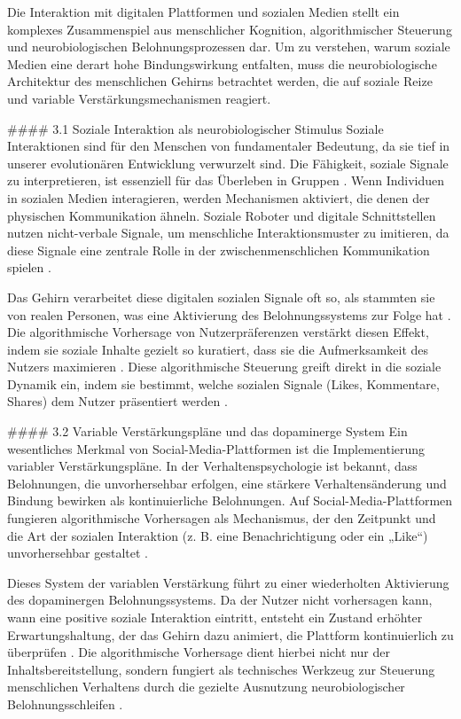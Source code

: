 \documentclass[11pt,a4paper]{article}
\begin{document}
Die Interaktion mit digitalen Plattformen und sozialen Medien stellt ein komplexes Zusammenspiel aus menschlicher Kognition, algorithmischer Steuerung und neurobiologischen Belohnungsprozessen dar. Um zu verstehen, warum soziale Medien eine derart hohe Bindungswirkung entfalten, muss die neurobiologische Architektur des menschlichen Gehirns betrachtet werden, die auf soziale Reize und variable Verstärkungsmechanismen reagiert.

\#\#\#\# 3.1 Soziale Interaktion als neurobiologischer Stimulus Soziale Interaktionen sind für den Menschen von fundamentaler Bedeutung, da sie tief in unserer evolutionären Entwicklung verwurzelt sind. Die Fähigkeit, soziale Signale zu interpretieren, ist essenziell für das Überleben in Gruppen \autocite{arxiv_2301_09025}. Wenn Individuen in sozialen Medien interagieren, werden Mechanismen aktiviert, die denen der physischen Kommunikation ähneln. Soziale Roboter und digitale Schnittstellen nutzen nicht-verbale Signale, um menschliche Interaktionsmuster zu imitieren, da diese Signale eine zentrale Rolle in der zwischenmenschlichen Kommunikation spielen \autocite{arxiv_2301_09025}.

Das Gehirn verarbeitet diese digitalen sozialen Signale oft so, als stammten sie von realen Personen, was eine Aktivierung des Belohnungssystems zur Folge hat \autocite{arxiv_2301_09025}. Die algorithmische Vorhersage von Nutzerpräferenzen verstärkt diesen Effekt, indem sie soziale Inhalte gezielt so kuratiert, dass sie die Aufmerksamkeit des Nutzers maximieren \autocite{arxiv_2305_11981}. Diese algorithmische Steuerung greift direkt in die soziale Dynamik ein, indem sie bestimmt, welche sozialen Signale (Likes, Kommentare, Shares) dem Nutzer präsentiert werden \autocite{arxiv_2305_11981}.

\#\#\#\# 3.2 Variable Verstärkungspläne und das dopaminerge System Ein wesentliches Merkmal von Social-Media-Plattformen ist die Implementierung variabler Verstärkungspläne. In der Verhaltenspsychologie ist bekannt, dass Belohnungen, die unvorhersehbar erfolgen, eine stärkere Verhaltensänderung und Bindung bewirken als kontinuierliche Belohnungen. Auf Social-Media-Plattformen fungieren algorithmische Vorhersagen als Mechanismus, der den Zeitpunkt und die Art der sozialen Interaktion (z. B. eine Benachrichtigung oder ein „Like“) unvorhersehbar gestaltet \autocite{arxiv_2305_11981}.

Dieses System der variablen Verstärkung führt zu einer wiederholten Aktivierung des dopaminergen Belohnungssystems. Da der Nutzer nicht vorhersagen kann, wann eine positive soziale Interaktion eintritt, entsteht ein Zustand erhöhter Erwartungshaltung, der das Gehirn dazu animiert, die Plattform kontinuierlich zu überprüfen \autocite{arxiv_2305_11981}. Die algorithmische Vorhersage dient hierbei nicht nur der Inhaltsbereitstellung, sondern fungiert als technisches Werkzeug zur Steuerung menschlichen Verhaltens durch die gezielte Ausnutzung neurobiologischer Belohnungsschleifen \autocite{arxiv_2305_11981}.
\end{document}
